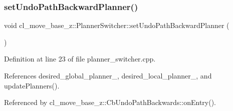 \subsubsection{\texorpdfstring{set\+Undo\+Path\+Backward\+Planner()}{setUndoPathBackwardPlanner()}}
{\footnotesize\ttfamily void cl\+\_\+move\+\_\+base\+\_\+z\+::\+Planner\+Switcher\+::set\+Undo\+Path\+Backward\+Planner (\begin{DoxyParamCaption}{ }\end{DoxyParamCaption})}



Definition at line 23 of file planner\+\_\+switcher.\+cpp.



References desired\+\_\+global\+\_\+planner\+\_\+, desired\+\_\+local\+\_\+planner\+\_\+, and update\+Planners().



Referenced by cl\+\_\+move\+\_\+base\+\_\+z\+::\+Cb\+Undo\+Path\+Backwards\+::on\+Entry().


